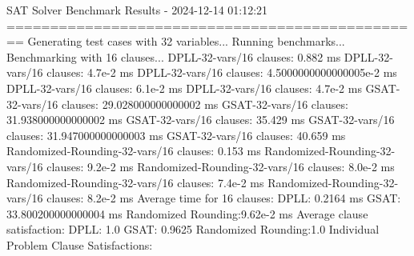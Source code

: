 \documentclass{article}
\begin{document}
\newpage
SAT Solver Benchmark Results - 2024-12-14 01:12:21\newline
================================================\newline
\newline
Generating test cases with 32 variables...\newline
\newline
Running benchmarks...\newline
Benchmarking with 16 clauses...\newline
DPLL-32-vars/16 clauses: 0.882 ms\newline
DPLL-32-vars/16 clauses: 4.7e-2 ms\newline
DPLL-32-vars/16 clauses: 4.5000000000000005e-2 ms\newline
DPLL-32-vars/16 clauses: 6.1e-2 ms\newline
DPLL-32-vars/16 clauses: 4.7e-2 ms\newline
GSAT-32-vars/16 clauses: 29.028000000000002 ms\newline
GSAT-32-vars/16 clauses: 31.938000000000002 ms\newline
GSAT-32-vars/16 clauses: 35.429 ms\newline
GSAT-32-vars/16 clauses: 31.947000000000003 ms\newline
GSAT-32-vars/16 clauses: 40.659 ms\newline
Randomized-Rounding-32-vars/16 clauses: 0.153 ms\newline
Randomized-Rounding-32-vars/16 clauses: 9.2e-2 ms\newline
Randomized-Rounding-32-vars/16 clauses: 8.0e-2 ms\newline
Randomized-Rounding-32-vars/16 clauses: 7.4e-2 ms\newline
Randomized-Rounding-32-vars/16 clauses: 8.2e-2 ms\newline
Average time for 16 clauses:\newline
  DPLL:               0.2164 ms\newline
  GSAT:               33.800200000000004 ms\newline
  Randomized Rounding:9.62e-2 ms\newline
Average clause satisfaction:\newline
  DPLL:               1.0\newline
  GSAT:               0.9625\newline
  Randomized Rounding:1.0\newline
\newline
Individual Problem Clause Satisfactions:\newline
\end{document}
